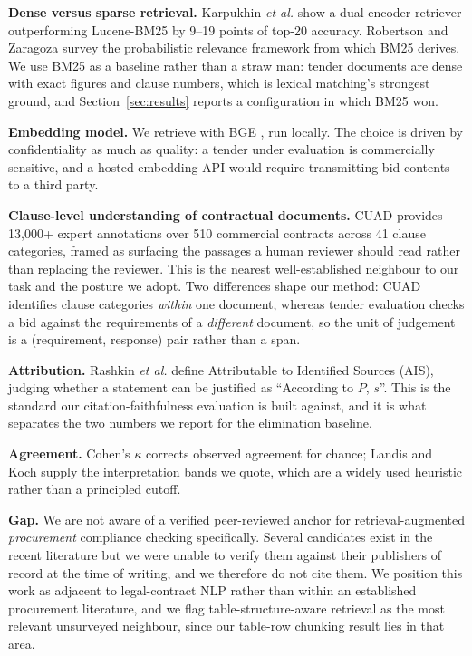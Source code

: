 \documentclass[conference]{IEEEtran}
\begin{document}
\textbf{Dense versus sparse retrieval.} Karpukhin \textit{et al.}
\cite{karpukhin2020dpr} show a dual-encoder retriever outperforming Lucene-BM25
by 9--19 points of top-20 accuracy. Robertson and Zaragoza \cite{robertson2009bm25}
survey the probabilistic relevance framework from which BM25 derives. We use
BM25 as a baseline rather than a straw man: tender documents are dense with
exact figures and clause numbers, which is lexical matching's strongest ground,
and Section~\ref{sec:results} reports a configuration in which BM25 won.

\textbf{Embedding model.} We retrieve with BGE \cite{xiao2023cpack}, run
locally. The choice is driven by confidentiality as much as quality: a tender
under evaluation is commercially sensitive, and a hosted embedding API would
require transmitting bid contents to a third party.

\textbf{Clause-level understanding of contractual documents.} CUAD
\cite{hendrycks2021cuad} provides 13{,}000+ expert annotations over 510
commercial contracts across 41 clause categories, framed as surfacing the
passages a human reviewer should read rather than replacing the reviewer. This
is the nearest well-established neighbour to our task and the posture we adopt.
Two differences shape our method: CUAD identifies clause categories \emph{within}
one document, whereas tender evaluation checks a bid against the requirements of
a \emph{different} document, so the unit of judgement is a
(requirement, response) pair rather than a span.

\textbf{Attribution.} Rashkin \textit{et al.} \cite{rashkin2023ais} define
Attributable to Identified Sources (AIS), judging whether a statement can be
justified as ``According to $P$, $s$''. This is the standard our
citation-faithfulness evaluation is built against, and it is what separates the
two numbers we report for the elimination baseline.

\textbf{Agreement.} Cohen's $\kappa$ \cite{cohen1960kappa} corrects observed
agreement for chance; Landis and Koch \cite{landis1977agreement} supply the
interpretation bands we quote, which are a widely used heuristic rather than a
principled cutoff.

\textbf{Gap.} We are not aware of a verified peer-reviewed anchor for
retrieval-augmented \emph{procurement} compliance checking specifically. Several
candidates exist in the recent literature but we were unable to verify them
against their publishers of record at the time of writing, and we therefore do
not cite them. We position this work as adjacent to legal-contract NLP rather
than within an established procurement literature, and we flag
table-structure-aware retrieval as the most relevant unsurveyed neighbour, since
our table-row chunking result lies in that area.
\end{document}
